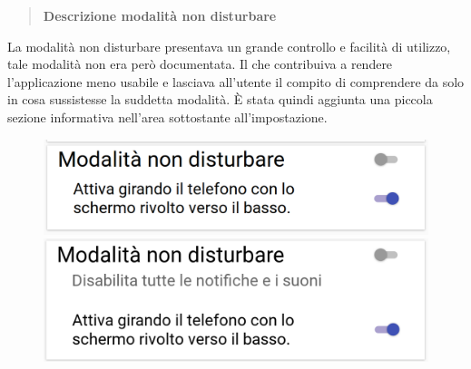 \begin{quote}
	\textbf{Descrizione modalità non disturbare}
\end{quote}
La modalità non disturbare presentava un grande controllo e facilità di
utilizzo, tale modalità non era però documentata.  Il che contribuiva a rendere
l'applicazione meno usabile e lasciava all'utente il compito di comprendere da
solo in cosa sussistesse la suddetta modalità.  È stata quindi aggiunta una
piccola sezione informativa nell'area sottostante all'impostazione.
\begin{figure}[H]
	\begin{minipage}{.49\textwidth}
		\includegraphics[width=\textwidth]{img/modifiche/non_disturbare_old.png}
	\end{minipage}
	\begin{minipage}{.49\textwidth}
		\includegraphics[width=\textwidth]{img/modifiche/non_disturbare_new.png}
	\end{minipage}
\end{figure}

